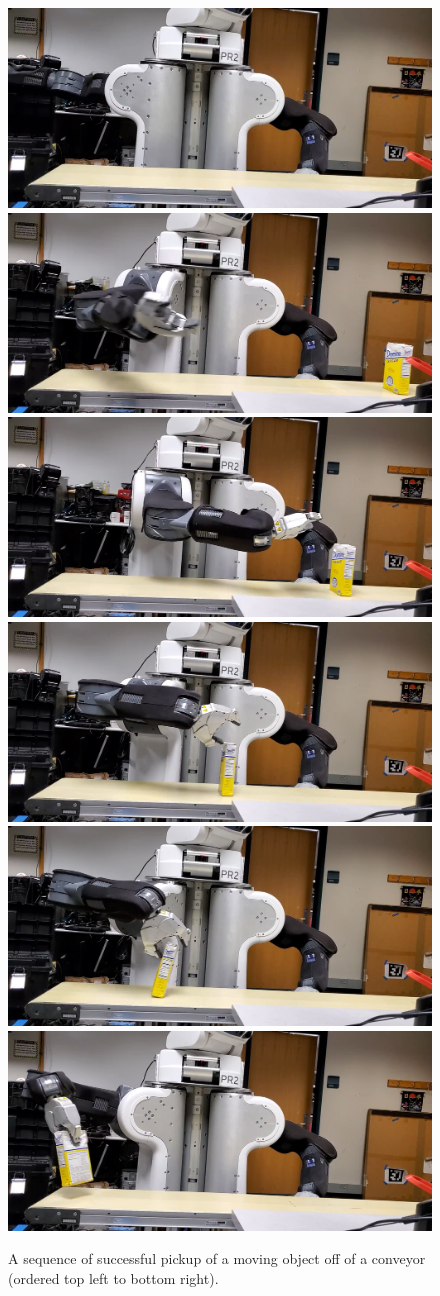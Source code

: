 \documentclass[a4paper]{report}
\begin{document}
\begin{figure}
  \includegraphics[width=0.5\linewidth]{pick1.png}
  \includegraphics[width=0.5\linewidth]{pick2.png}
  \includegraphics[width=0.5\linewidth]{pick3.png}
  \includegraphics[width=0.5\linewidth]{pick4.png}
  \includegraphics[width=0.5\linewidth]{pick5.png}
  \includegraphics[width=0.5\linewidth]{pick6.png}
  
  
    \caption{A sequence of successful pickup of a moving object off of a conveyor (ordered top left to bottom right). 
    }
    \label{fig:pickup}
\end{figure}
\end{document}
